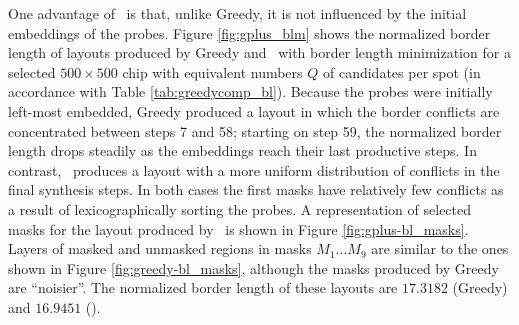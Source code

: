 One advantage of \Greedyplus\ is that, unlike Greedy, it is not influenced by
the initial embeddings of the probes. Figure \ref{fig:gplus_blm} shows the
normalized border length of layouts produced by Greedy and \Greedyplus\ with
border length minimization for a selected $500\times 500$ chip with equivalent
numbers $Q$ of candidates per spot (in accordance with Table
\ref{tab:greedycomp_bl}). Because the probes were initially left-most embedded,
Greedy produced a layout in which the border conflicts are concentrated between
steps 7 and 58; starting on step 59, the normalized border length drops steadily
as the embeddings reach their last productive steps. In contrast, \Greedyplus\
produces a layout with a more uniform distribution of conflicts in the final
synthesis steps. In both cases the first masks have relatively few conflicts as
a result of lexicographically sorting the probes. A representation of selected
masks for the layout produced by \Greedyplus\ is shown in Figure
\ref{fig:gplus-bl_masks}. Layers of masked and unmasked regions in masks
$M_1 \dots M_9$ are similar to the ones shown in Figure
\ref{fig:greedy-bl_masks}, although the masks produced by Greedy are
``noisier''. The normalized border length of these layouts are $17.3182$
(Greedy) and $16.9451$ (\Greedyplus).

